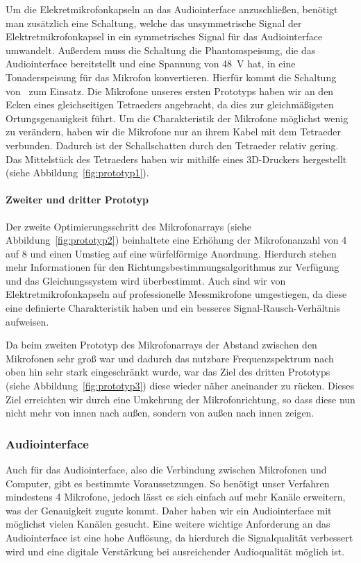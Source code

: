 Um die Elekretmikrofonkapseln an das Audiointerface anzuschließen, benötigt man zusätzlich eine Schaltung, welche das unsymmetrische Signal der Elektretmikrofonkapsel in ein symmetrisches Signal für das Audiointerface umwandelt. Außerdem muss die Schaltung die Phantomspeisung, die das Audiointerface bereitstellt und eine Spannung von \SI{48}{\volt} hat, in eine Tonaderspeisung für das Mikrofon konvertieren. Hierfür kommt die Schaltung von~\cite{Powering_microphones} zum Einsatz.
Die Mikrofone unseres ersten Prototyps haben wir an den Ecken eines gleichseitigen Tetraeders angebracht, da dies zur gleichmäßigsten Ortungsgenauigkeit führt. Um die Charakteristik der Mikrofone möglichst wenig zu verändern, haben wir die Mikrofone nur an ihrem Kabel mit dem Tetraeder verbunden. Dadurch ist der Schallschatten durch den Tetraeder relativ gering. Das Mittelstück des Tetraeders haben wir mithilfe eines 3D-Druckers hergestellt (siehe Abbildung~\ref{fig:prototyp1}).\\

\paragraph{Zweiter und dritter Prototyp}
Der zweite Optimierungsschritt des Mikrofonarrays (siehe Abbildung~\ref{fig:prototyp2}) beinhaltete eine Erhöhung der Mikrofonanzahl von \num{4} auf \num{8} und einen Umstieg auf eine würfelförmige Anordnung. Hierdurch stehen mehr Informationen für den Richtungsbestimmungsalgorithmus zur Verfügung und das Gleichungssystem wird überbestimmt. Auch sind wir von Elektretmikrofonkapseln auf professionelle Messmikrofone umgestiegen, da diese eine definierte Charakteristik haben und ein besseres Signal-Rausch-Verhältnis aufweisen.

Da beim zweiten Prototyp des Mikrofonarrays der Abstand zwischen den Mikrofonen sehr groß war und dadurch das nutzbare Frequenzspektrum nach oben hin sehr stark eingeschränkt wurde, war das Ziel des dritten Prototyps (siehe Abbildung~\ref{fig:prototyp3}) diese wieder näher aneinander zu rücken. Dieses Ziel erreichten wir durch eine Umkehrung der Mikrofonrichtung, so dass diese nun nicht mehr von innen nach außen, sondern von außen nach innen zeigen.
\subsubsection{Audiointerface}
Auch für das Audiointerface, also die Verbindung zwischen Mikrofonen und Computer, gibt es bestimmte Voraussetzungen. So benötigt unser Verfahren mindestens \num{4} Mikrofone, jedoch lässt es sich einfach auf mehr Kanäle erweitern, was der Genauigkeit zugute kommt. Daher haben wir ein Audiointerface mit möglichst vielen Kanälen gesucht. Eine weitere wichtige Anforderung an das Audiointerface ist eine hohe Auflösung, da hierdurch die Signalqualität verbessert wird und eine digitale Verstärkung bei ausreichender Audioqualität möglich ist.
